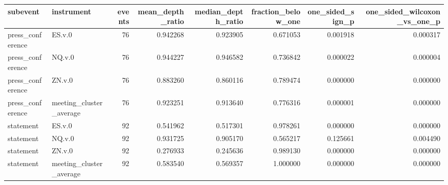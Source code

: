 \begin{tabular}{llrrrrrr}
\toprule
subevent & instrument & events & mean_depth_ratio & median_depth_ratio & fraction_below_one & one_sided_sign_p & one_sided_wilcoxon_vs_one_p \\
\midrule
press_conference & ES.v.0 & 76 & 0.942268 & 0.923905 & 0.671053 & 0.001918 & 0.000317 \\
press_conference & NQ.v.0 & 76 & 0.944227 & 0.946582 & 0.736842 & 0.000022 & 0.000004 \\
press_conference & ZN.v.0 & 76 & 0.883260 & 0.860116 & 0.789474 & 0.000000 & 0.000000 \\
press_conference & meeting_cluster_average & 76 & 0.923251 & 0.913640 & 0.776316 & 0.000001 & 0.000000 \\
statement & ES.v.0 & 92 & 0.541962 & 0.517301 & 0.978261 & 0.000000 & 0.000000 \\
statement & NQ.v.0 & 92 & 0.931725 & 0.905170 & 0.565217 & 0.125661 & 0.004490 \\
statement & ZN.v.0 & 92 & 0.276933 & 0.245636 & 0.989130 & 0.000000 & 0.000000 \\
statement & meeting_cluster_average & 92 & 0.583540 & 0.569357 & 1.000000 & 0.000000 & 0.000000 \\
\bottomrule
\end{tabular}
